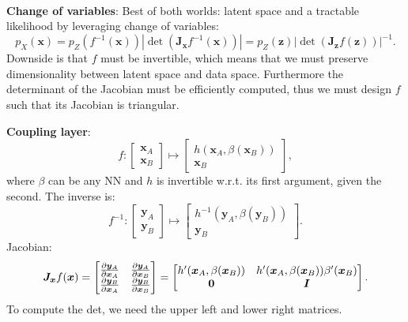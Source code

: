 \documentclass{article}
\renewcommand{\vec}[1]{\bm{#1}}
\newcommand{\mat}[1]{\bm{#1}}
\newenvironment{topic}[1]
{\textbf{\sffamily \colorbox{black}{\rlap{\textbf{\textcolor{white}{#1}}}\hspace{\linewidth}\hspace{-2\fboxsep}}} \\ \vspace{0.2cm}}
{}
\begin{document}
\begin{multicols*}{2}
\begin{topic}{Normalizing flow}
        \textbf{Change of variables}: Best of both worlds: latent space and a tractable likelihood by
        leveraging change of variables: \[
            p_X(\vec{x}) = p_Z(f^{-1}(\vec{x})) | \det(\mat{J}_{\vec{x}} f^{-1}(\vec{x})) | = p_Z(\vec{z}) |\det(\mat{J}_{\vec{z}} f(\vec{z}))|^{-1}.
        \]
        Downside is that $f$ must be invertible, which means that we must preserve dimensionality between
        latent space and data space. Furthermore the determinant of the Jacobian must be efficiently
        computed, thus we must design $f$ such that its Jacobian is triangular.

        \textbf{Coupling layer}: \[
            f: \begin{bmatrix}
                \vec{x}_A \\ \vec{x}_B
            \end{bmatrix}
            \mapsto
            \begin{bmatrix}
                h(\vec{x}_A, \beta(\vec{x}_B)) \\
                \vec{x}_B
            \end{bmatrix},
        \]
        where $\beta$ can be any NN and $h$ is invertible w.r.t. its first argument, given the second. The
        inverse is: \[
            f^{-1}: \begin{bmatrix}
                \vec{y}_A \\
                \vec{y}_B
            \end{bmatrix}
            \mapsto
            \begin{bmatrix}
                h^{-1}(\vec{y}_A, \beta(\vec{y}_B)) \\
                \vec{y}_B
            \end{bmatrix}.
        \]
        Jacobian: \[
            \mat{J}_{\vec{x}} f(\vec{x}) = \begin{bmatrix}
                \pdv{\vec{y}_A}{\vec{x}_A} & \pdv{\vec{y}_A}{\vec{x}_B} \\
                \pdv{\vec{y}_B}{\vec{x}_A} & \pdv{\vec{y}_B}{\vec{x}_B}
            \end{bmatrix}
            = \begin{bmatrix}
                h'(\vec{x}_A, \beta(\vec{x}_B)) & h'(\vec{x}_A, \beta(\vec{x}_B)) \beta'(\vec{x}_B) \\
                \mat{0}                         & \mat{I}
            \end{bmatrix}.
        \]
        To compute the det, we need the upper left and lower right matrices.


\end{topic}
\end{multicols*}
\end{document}
